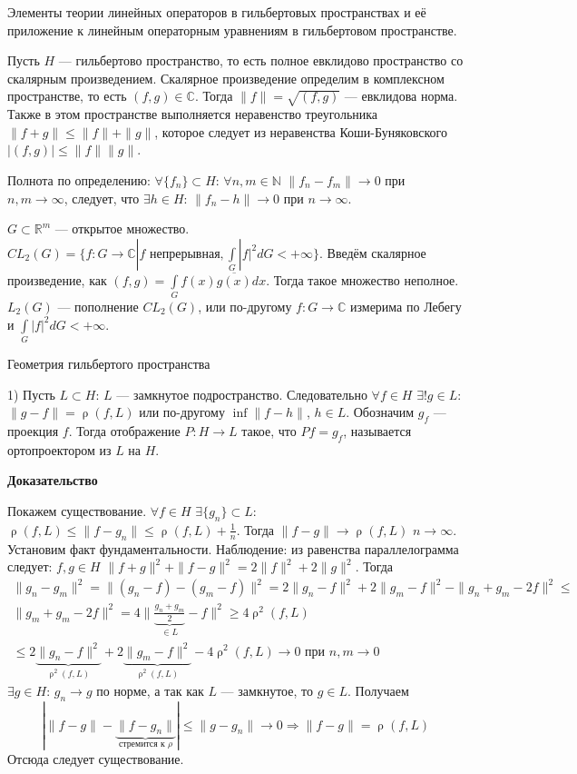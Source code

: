 \documentclass[12pt]{article}
\DeclareMathOperator{\rh}{\rho}
\begin{document}
\begin{center}
Элементы теории линейных операторов в гильбертовых пространствах и её приложение к линейным операторным уравнениям в гильбертовом пространстве.
\end{center}

Пусть $H$ --- гильбертово пространство, то есть полное евклидово пространство со скалярным произведением.
Скалярное произведение определим в комплексном пространстве, то есть $(f,g)\in \mathbb C$.
Тогда $\|f\|=\sqrt{(f,g)}$ --- евклидова норма.
Также в этом пространстве выполняется неравенство треугольника $\|f+g\|\le\|f\|+\|g\|$, которое следует из неравенства Коши-Буняковского $|(f,g)|\le\|f\|\|g\|$.

Полнота по определению: $\forall \{f_n\}\subset H$: $\forall n,m\in\mathbb N$ $\|f_n-f_m\|\to0$ при $n,m\to\infty$, следует, что $\exists h \in H$: $\|f_n-h\|\to0$ при $n\to\infty$.

$G\subset\mathbb R^m$ --- открытое множество.
$CL_2(G)=\{f:G\to\mathbb C|f\text{ непрерывная}, \int\limits_G|f|^2 dG<+\infty\}$.
Введём скалярное произведение, как $(f,g)=\int\limits_G f(x)\overline{g(x)} dx$. Тогда такое множество неполное.
$L_2(G)$ --- пополнение $CL_2(G)$, или по-другому $f:G\to\mathbb C$ измерима по Лебегу и $\int\limits_G|f|^2 dG<+\infty$.
\begin{center}
Геометрия гильбертого пространства
\end{center}

1) Пусть $L\subset H$: $L$ --- замкнутое подространство.
Следовательно $\forall f\in H$ $\exists! g\in L$: $\|g-f\|=\rh(f,L)$ или по-другому $\inf\|f-h\|$, $h\in L$.
Обозначим $g_f$ --- проекция $f$.
Тогда отображение $P:H\to L$ такое, что $Pf=g_f$, называется ортопроектором из $L$ на $H$.

\textbf{Доказательство}

Покажем существование.
$\forall f\in H$ $\exists \{g_n\}\subset L$: $\rh(f,L)\le \|f-g_n\|\le\rh(f,L)+\frac{1}{n}$.
Тогда $\|f-g\|\to\rh(f,L)$ $n\to\infty$.
Установим факт фундаментальности.
Наблюдение: из равенства параллелограмма следует: $f, g\in H$ $\|f+g\|^2+\|f-g\|^2=2\|f\|^2+2\|g\|^2$.
Тогда
\begin{gather*}
\|g_n-g_m\|^2=\|(g_n-f)-(g_m-f)\|^2=2\|g_n-f\|^2+2\|g_m-f\|^2-\|g_n+g_m-2f\|^2\boxed{\le}\\
\|g_m+g_m-2f\|^2=4\|\underbrace{\frac{g_n+g_m}2}_{\in L}-f\|^2\ge4\rh^2(f,L)\\
\boxed{\le}2\underbrace{\|g_n-f\|^2}_{\rh^2(f,L)}+2\underbrace{\|g_m-f\|^2}_{\rh^2(f,L)}-4\rh^2(f,L)\to0\text{ при }n,m\to0
\end{gather*}
$\exists g\in H$: $g_n\to  g$ по норме, а так как $L$ --- замкнутое, то $g\in L$.
Получаем 
$$
|\|f-g\|-\underbrace{\|f-g_n\|}_{\text{стремится к }\rho}|\le\|g-g_n\|\to0\Rightarrow\|f-g\|=\rh(f,L)
$$
Отсюда следует существование.
\end{document}
